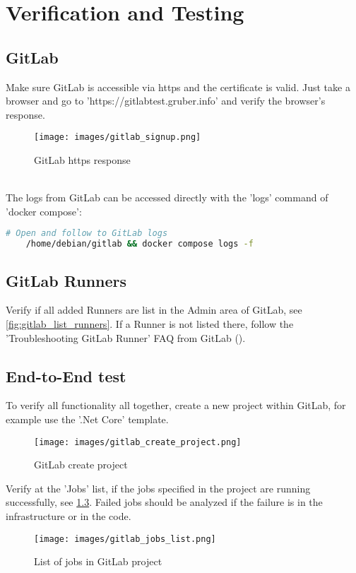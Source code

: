 \chapter{Verification and Testing}

\section{GitLab}

Make sure GitLab is accessible via https and the certificate is valid.
Just take a browser and go to 'https://gitlabtest.gruber.info' and verify the browser's response.

\begin{figure}[H]
	\centering
	\texttt{[image: images/gitlab\_signup.png]}
	\caption{GitLab https response}
	\label{fig:gitlab_response}
\end{figure}
\  \\

The logs from GitLab can be accessed directly with the 'logs' command of 'docker compose':
\begin{lstlisting}[language=bash,caption={GitLab Logging},label={code:gitlab-logging}]
    # Open and follow to GitLab logs
    /home/debian/gitlab && docker compose logs -f
\end{lstlisting}

\section{GitLab Runners}

Verify if all added Runners are list in the Admin area of GitLab, see \ref{fig:gitlab_list_runners}.
If a Runner is not listed there, follow the 'Troubleshooting GitLab Runner' FAQ from GitLab (\cite{refGitLabRunnersTroubleshooting}).

\section{End-to-End test}

To verify all functionality all together, create a new project within GitLab, for example use the '.Net Core' template.
\begin{figure}[H]
	\centering
	\texttt{[image: images/gitlab\_create\_project.png]}
	\caption{GitLab create project}
	\label{fig:gitlab_create_project}
\end{figure}

Verify at the 'Jobs' list, if the jobs specified in the project are running successfully, see \ref{fig:gitlab_jobs_list}.
Failed jobs should be analyzed if the failure is in the infrastructure or in the code.
\begin{figure}[H]
	\centering
	\texttt{[image: images/gitlab\_jobs\_list.png]}
	\caption{List of jobs in GitLab project}
	\label{fig:gitlab_jobs_list}
\end{figure}